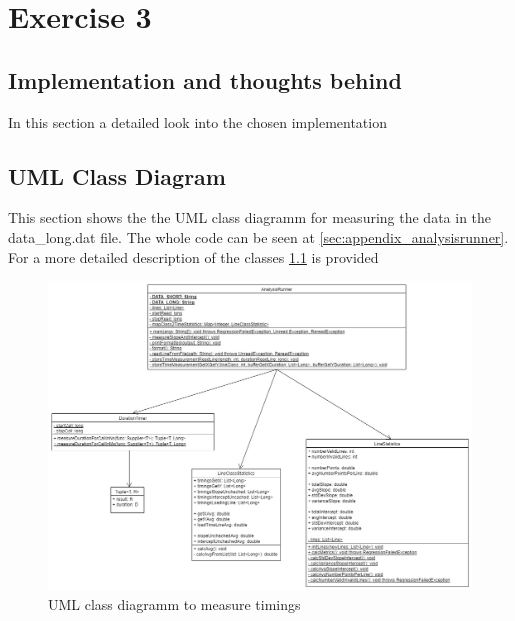 \chapter{Exercise 3}

\section{Implementation and thoughts behind}
\label{sec:detail_impl_analysisrunner}
In this section a detailed look into the chosen implementation 

\section{UML Class Diagram}
This section shows the the UML class diagramm for measuring the data in the data\_long.dat file. The whole code can be seen at \ref{sec:appendix_analysisrunner}. For a more detailed description of the classes \ref{sec:detail_impl_analysisrunner} is provided

\begin{landscape}
    \begin{figure}
        \begin{center}
            \includegraphics[width=1.45\textwidth]{img/classdiagram.png}
            \caption{UML class diagramm to measure timings}
        \end{center}
    \end{figure}
\end{landscape}